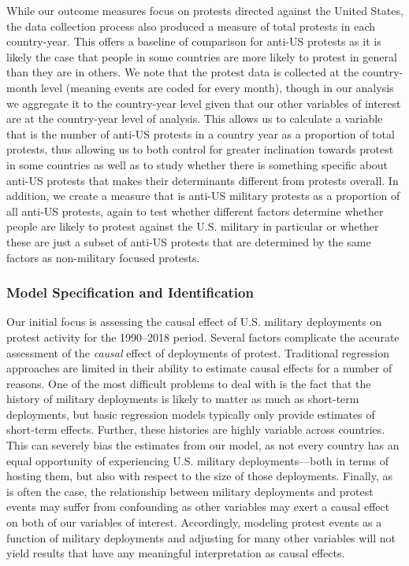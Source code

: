 While our outcome measures focus on protests directed against the United States, the data collection process also produced a measure of total protests in each country-year. This offers a baseline of comparison for anti-US protests as it is likely the case that people in some countries are more likely to protest in general than they are in others. We note that the protest data is collected at the country-month level (meaning events are coded for every month), though in our analysis we aggregate it to the country-year level given that our other variables of interest are at the country-year level of analysis.  This allows us to calculate a variable that is the number of anti-US protests in a country year as a proportion of total protests, thus allowing us to both control for greater inclination towards protest in some countries as well as to study whether there is something specific about anti-US protests that makes their determinants different from protests overall. In addition, we create a measure that is anti-US military protests as a proportion of all anti-US protests, again to test whether different factors determine whether people are likely to protest against the U.S. military in particular or whether these are just a subset of anti-US protests that are determined by the same factors as non-military focused protests.           


\subsubsection*{Model Specification and Identification}


Our initial focus is assessing the causal effect of U.S. military deployments on protest activity for the 1990--2018 period. Several factors complicate the accurate assessment of the \textit{causal} effect of deployments of protest. Traditional regression approaches are limited in their ability to estimate causal effects for a number of reasons. One of the most difficult problems to deal with is the fact that the history of military deployments is likely to matter as much as short-term deployments, but basic regression models typically only provide estimates of short-term effects. Further, these histories are highly variable across countries. This can severely bias the estimates from our model, as not every country has an equal opportunity of experiencing U.S. military deployments---both in terms of hosting them, but also with respect to the size of those deployments. Finally, as is often the case, the relationship between military deployments and protest events may suffer from confounding as other variables may exert a causal effect on both of our variables of interest. Accordingly, modeling protest events as a function of military deployments and adjusting for many other variables will not yield results that have any meaningful interpretation as causal effects. 

